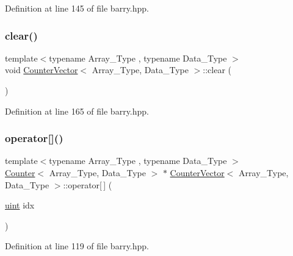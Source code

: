 Definition at line 145 of file barry.\+hpp.

\mbox{\label{classbarry_1_1_counter_vector_acce75748f917e3a7898d49a23df996e7}} 
\subsubsection{\texorpdfstring{clear()}{clear()}}
{\footnotesize\ttfamily template$<$typename Array\+\_\+\+Type , typename Data\+\_\+\+Type $>$ \\
void \hyperlink{classbarry_1_1_counter_vector}{Counter\+Vector}$<$ Array\+\_\+\+Type, Data\+\_\+\+Type $>$\+::clear (\begin{DoxyParamCaption}{ }\end{DoxyParamCaption})\hspace{0.3cm}{\ttfamily [inline]}}



Definition at line 165 of file barry.\+hpp.

\mbox{\label{classbarry_1_1_counter_vector_a6eac3e73298e1e6d424b92f324ffe9a8}} 
\subsubsection{\texorpdfstring{operator[]()}{operator[]()}}
{\footnotesize\ttfamily template$<$typename Array\+\_\+\+Type , typename Data\+\_\+\+Type $>$ \\
\hyperlink{classbarry_1_1_counter}{Counter}$<$ Array\+\_\+\+Type, Data\+\_\+\+Type $>$ $\ast$ \hyperlink{classbarry_1_1_counter_vector}{Counter\+Vector}$<$ Array\+\_\+\+Type, Data\+\_\+\+Type $>$\+::operator\mbox{[}$\,$\mbox{]} (\begin{DoxyParamCaption}\item[{\hyperlink{namespacebarry_a11dfc53ddb4672278319aa04f1e09a6c}{uint}}]{idx }\end{DoxyParamCaption})\hspace{0.3cm}{\ttfamily [inline]}}



Definition at line 119 of file barry.\+hpp.

